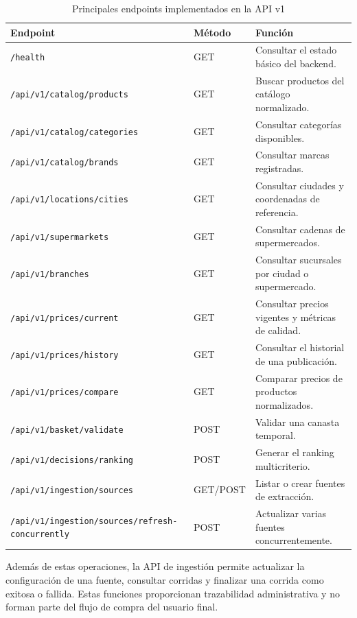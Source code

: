 \begin{table}[H]
\centering
\small
\begin{tabular}{|p{5.6cm}|p{1.5cm}|p{6cm}|}
\hline
\textbf{Endpoint} & \textbf{Método} & \textbf{Función} \\
\hline
\texttt{/health} & GET & Consultar el estado básico del backend. \\
\hline
\texttt{/api/v1/catalog/products} & GET & Buscar productos del catálogo normalizado. \\
\hline
\texttt{/api/v1/catalog/categories} & GET & Consultar categorías disponibles. \\
\hline
\texttt{/api/v1/catalog/brands} & GET & Consultar marcas registradas. \\
\hline
\texttt{/api/v1/locations/cities} & GET & Consultar ciudades y coordenadas de referencia. \\
\hline
\texttt{/api/v1/supermarkets} & GET & Consultar cadenas de supermercados. \\
\hline
\texttt{/api/v1/branches} & GET & Consultar sucursales por ciudad o supermercado. \\
\hline
\texttt{/api/v1/prices/current} & GET & Consultar precios vigentes y métricas de calidad. \\
\hline
\texttt{/api/v1/prices/history} & GET & Consultar el historial de una publicación. \\
\hline
\texttt{/api/v1/prices/compare} & GET & Comparar precios de productos normalizados. \\
\hline
\texttt{/api/v1/basket/validate} & POST & Validar una canasta temporal. \\
\hline
\texttt{/api/v1/decisions/ranking} & POST & Generar el ranking multicriterio. \\
\hline
\texttt{/api/v1/ingestion/sources} & GET/POST & Listar o crear fuentes de extracción. \\
\hline
\texttt{/api/v1/ingestion/sources/refresh-concurrently} & POST & Actualizar varias fuentes concurrentemente. \\
\hline
\end{tabular}
\caption{Principales endpoints implementados en la API v1}
\label{tab:endpoints_api_reales}
\end{table}

Además de estas operaciones, la API de ingestión permite actualizar la
configuración de una fuente, consultar corridas y finalizar una corrida como
exitosa o fallida. Estas funciones proporcionan trazabilidad administrativa y
no forman parte del flujo de compra del usuario final.

